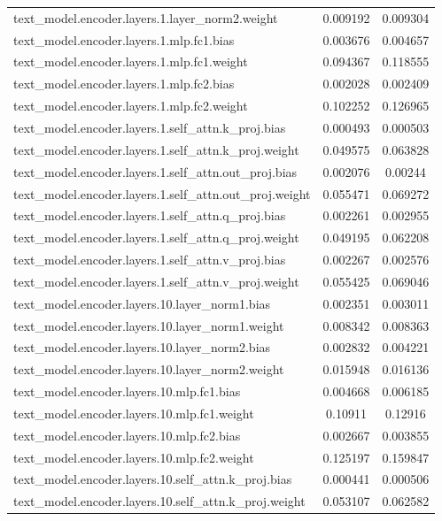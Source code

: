 \begin{longtable}{lcc}
text\_model.encoder.layers.1.layer\_norm2.weight & 0.009192 & 0.009304 \\
text\_model.encoder.layers.1.mlp.fc1.bias & 0.003676 & 0.004657 \\
text\_model.encoder.layers.1.mlp.fc1.weight & 0.094367 & 0.118555 \\
text\_model.encoder.layers.1.mlp.fc2.bias & 0.002028 & 0.002409 \\
text\_model.encoder.layers.1.mlp.fc2.weight & 0.102252 & 0.126965 \\
text\_model.encoder.layers.1.self\_attn.k\_proj.bias & 0.000493 & 0.000503 \\
text\_model.encoder.layers.1.self\_attn.k\_proj.weight & 0.049575 & 0.063828 \\
text\_model.encoder.layers.1.self\_attn.out\_proj.bias & 0.002076 & 0.00244 \\
text\_model.encoder.layers.1.self\_attn.out\_proj.weight & 0.055471 & 0.069272 \\
text\_model.encoder.layers.1.self\_attn.q\_proj.bias & 0.002261 & 0.002955 \\
text\_model.encoder.layers.1.self\_attn.q\_proj.weight & 0.049195 & 0.062208 \\
text\_model.encoder.layers.1.self\_attn.v\_proj.bias & 0.002267 & 0.002576 \\
text\_model.encoder.layers.1.self\_attn.v\_proj.weight & 0.055425 & 0.069046 \\
text\_model.encoder.layers.10.layer\_norm1.bias & 0.002351 & 0.003011 \\
text\_model.encoder.layers.10.layer\_norm1.weight & 0.008342 & 0.008363 \\
text\_model.encoder.layers.10.layer\_norm2.bias & 0.002832 & 0.004221 \\
text\_model.encoder.layers.10.layer\_norm2.weight & 0.015948 & 0.016136 \\
text\_model.encoder.layers.10.mlp.fc1.bias & 0.004668 & 0.006185 \\
text\_model.encoder.layers.10.mlp.fc1.weight & 0.10911 & 0.12916 \\
text\_model.encoder.layers.10.mlp.fc2.bias & 0.002667 & 0.003855 \\
text\_model.encoder.layers.10.mlp.fc2.weight & 0.125197 & 0.159847 \\
text\_model.encoder.layers.10.self\_attn.k\_proj.bias & 0.000441 & 0.000506 \\
text\_model.encoder.layers.10.self\_attn.k\_proj.weight & 0.053107 & 0.062582 \\

\end{longtable}
